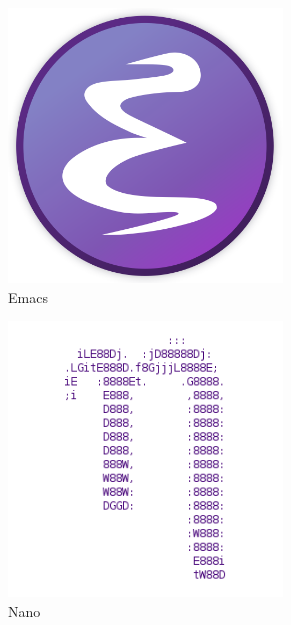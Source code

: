 \documentclass[letter, 12pt]{article}
\begin{document}
\begin{figure}[h]
	\centering
	\begin{subfigure}{.3\textwidth}
		\includegraphics[width=0.8\textwidth]{emacslogo.png}
		\caption{Emacs}
	\end{subfigure}
	\qquad %
	\begin{subfigure}{.3\textwidth}
		\includegraphics[width=0.8\textwidth]{nanologo.png}
		\caption{Nano}
	\end{subfigure}
	\begin{subfigure}{.3\textwidth}

\end{subfigure}
\end{figure}
\end{document}
